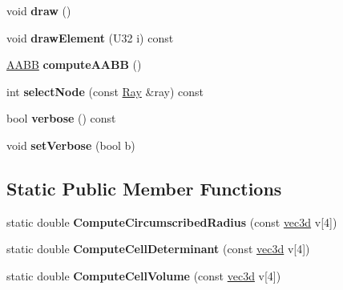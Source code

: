 \begin{DoxyCompactItemize}
\item 
\hypertarget{classps_1_1elastic_1_1VolMesh_ad8e58758dc76e01c9a92d45fec545a09}{}void {\bfseries draw} ()\label{classps_1_1elastic_1_1VolMesh_ad8e58758dc76e01c9a92d45fec545a09}

\item 
\hypertarget{classps_1_1elastic_1_1VolMesh_aa8b6f71abb3b6e7a0cff29ac22ada02a}{}void {\bfseries draw\+Element} (U32 i) const \label{classps_1_1elastic_1_1VolMesh_aa8b6f71abb3b6e7a0cff29ac22ada02a}

\item 
\hypertarget{classps_1_1elastic_1_1VolMesh_a40bedb0cb685045f536fe523eac8f7a3}{}\hyperlink{classps_1_1base_1_1AABB}{A\+A\+B\+B} {\bfseries compute\+A\+A\+B\+B} ()\label{classps_1_1elastic_1_1VolMesh_a40bedb0cb685045f536fe523eac8f7a3}

\item 
\hypertarget{classps_1_1elastic_1_1VolMesh_a97ff3111e9d6cb683f5ebce64abc84bf}{}int {\bfseries select\+Node} (const \hyperlink{classps_1_1base_1_1Ray}{Ray} \&ray) const \label{classps_1_1elastic_1_1VolMesh_a97ff3111e9d6cb683f5ebce64abc84bf}

\item 
\hypertarget{classps_1_1elastic_1_1VolMesh_aa78fbef753134fb6b13962b5db60ae7b}{}bool {\bfseries verbose} () const \label{classps_1_1elastic_1_1VolMesh_aa78fbef753134fb6b13962b5db60ae7b}

\item 
\hypertarget{classps_1_1elastic_1_1VolMesh_a35ee920238424a53b34407dea46f6ab6}{}void {\bfseries set\+Verbose} (bool b)\label{classps_1_1elastic_1_1VolMesh_a35ee920238424a53b34407dea46f6ab6}

\end{DoxyCompactItemize}
\subsection*{Static Public Member Functions}
\begin{DoxyCompactItemize}
\item 
\hypertarget{classps_1_1elastic_1_1VolMesh_af2c0768be3acb734df082712d6dd70ce}{}static double {\bfseries Compute\+Circumscribed\+Radius} (const \hyperlink{classps_1_1base_1_1Vec3}{vec3d} v\mbox{[}4\mbox{]})\label{classps_1_1elastic_1_1VolMesh_af2c0768be3acb734df082712d6dd70ce}

\item 
\hypertarget{classps_1_1elastic_1_1VolMesh_a5ee3dad4afc9eeb54d890ea6462cb8e7}{}static double {\bfseries Compute\+Cell\+Determinant} (const \hyperlink{classps_1_1base_1_1Vec3}{vec3d} v\mbox{[}4\mbox{]})\label{classps_1_1elastic_1_1VolMesh_a5ee3dad4afc9eeb54d890ea6462cb8e7}

\item 
\hypertarget{classps_1_1elastic_1_1VolMesh_a790bef93bef6986d7d0e5e50a10bb348}{}static double {\bfseries Compute\+Cell\+Volume} (const \hyperlink{classps_1_1base_1_1Vec3}{vec3d} v\mbox{[}4\mbox{]})\label{classps_1_1elastic_1_1VolMesh_a790bef93bef6986d7d0e5e50a10bb348}

\end{DoxyCompactItemize}

